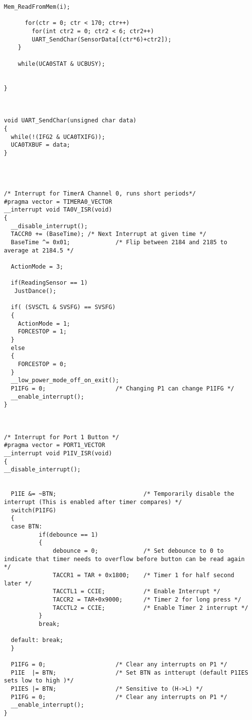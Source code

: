\begin{lstlisting}[caption=Main.c,label=Code4]
      Mem_ReadFromMem(i);
      
      for(ctr = 0; ctr < 170; ctr++)
        for(int ctr2 = 0; ctr2 < 6; ctr2++)
		UART_SendChar(SensorData[(ctr*6)+ctr2]);
    }
    
    while(UCA0STAT & UCBUSY);
    

}



void UART_SendChar(unsigned char data)
{ 
  while(!(IFG2 & UCA0TXIFG));
  UCA0TXBUF = data;  
}




/* Interrupt for TimerA Channel 0, runs short periods*/
#pragma vector = TIMERA0_VECTOR
__interrupt void TA0V_ISR(void)
{
  __disable_interrupt();
  TACCR0 += (BaseTime); /* Next Interrupt at given time */
  BaseTime ^= 0x01;             /* Flip between 2184 and 2185 to average at 2184.5 */
  
  ActionMode = 3;

  if(ReadingSensor == 1)
   JustDance(); 

  if( (SVSCTL & SVSFG) == SVSFG)
  {
    ActionMode = 1;
    FORCESTOP = 1;
  }
  else
  {
    FORCESTOP = 0;
  }
  __low_power_mode_off_on_exit();
  P1IFG = 0;                    /* Changing P1 can change P1IFG */
  __enable_interrupt();
}



/* Interrupt for Port 1 Button */
#pragma vector = PORT1_VECTOR
__interrupt void P1IV_ISR(void)
{
__disable_interrupt();  
  
  
  P1IE &= ~BTN;                         /* Temporarily disable the interrupt (This is enabled after timer compares) */
  switch(P1IFG)
  {
  case BTN:
          if(debounce == 1)
          {
              debounce = 0;             /* Set debounce to 0 to indicate that timer needs to overflow before button can be read again */        
              TACCR1 = TAR + 0x1800;    /* Timer 1 for half second later */
              TACCTL1 = CCIE;           /* Enable Interrupt */        
              TACCR2 = TAR+0x9000;      /* Timer 2 for long press */
              TACCTL2 = CCIE;           /* Enable Timer 2 interrupt */
          }
          break;
          
  default: break;
  }
  
  P1IFG = 0;                    /* Clear any interrupts on P1 */
  P1IE  |= BTN;                 /* Set BTN as intterupt (default P1IES sets low to high )*/
  P1IES |= BTN;                 /* Sensitive to (H->L) */
  P1IFG = 0;                    /* Clear any interrupts on P1 */
  __enable_interrupt();
}


\end{lstlisting}
